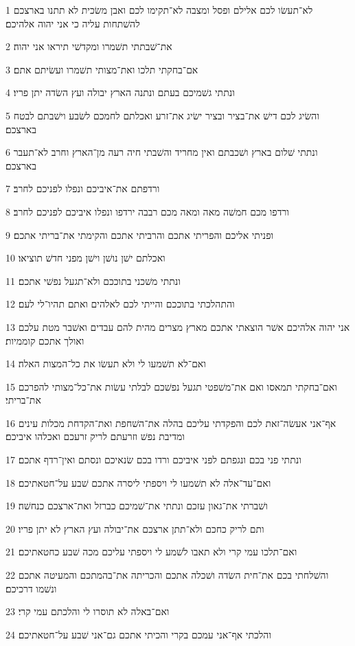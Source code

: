 \par 1 לא־תעשׂו לכם אלילם ופסל ומצבה לא־תקימו לכם ואבן משׂכית לא תתנו בארצכם להשׁתחות עליה כי אני יהוה אלהיכם׃
\par 2 את־שׁבתתי תשׁמרו ומקדשׁי תיראו אני יהוה׃
\par 3 אם־בחקתי תלכו ואת־מצותי תשׁמרו ועשׂיתם אתם׃
\par 4 ונתתי גשׁמיכם בעתם ונתנה הארץ יבולה ועץ השׂדה יתן פריו׃
\par 5 והשׂיג לכם דישׁ את־בציר ובציר ישׂיג את־זרע ואכלתם לחמכם לשׂבע וישׁבתם לבטח בארצכם׃
\par 6 ונתתי שׁלום בארץ ושׁכבתם ואין מחריד והשׁבתי חיה רעה מן־הארץ וחרב לא־תעבר בארצכם׃
\par 7 ורדפתם את־איביכם ונפלו לפניכם לחרב׃
\par 8 ורדפו מכם חמשׁה מאה ומאה מכם רבבה ירדפו ונפלו איביכם לפניכם לחרב׃
\par 9 ופניתי אליכם והפריתי אתכם והרביתי אתכם והקימתי את־בריתי אתכם׃
\par 10 ואכלתם ישׁן נושׁן וישׁן מפני חדשׁ תוציאו׃
\par 11 ונתתי משׁכני בתוככם ולא־תגעל נפשׁי אתכם׃
\par 12 והתהלכתי בתוככם והייתי לכם לאלהים ואתם תהיו־לי לעם׃
\par 13 אני יהוה אלהיכם אשׁר הוצאתי אתכם מארץ מצרים מהית להם עבדים ואשׁבר מטת עלכם ואולך אתכם קוממיות׃
\par 14 ואם־לא תשׁמעו לי ולא תעשׂו את כל־המצות האלה׃
\par 15 ואם־בחקתי תמאסו ואם את־משׁפטי תגעל נפשׁכם לבלתי עשׂות את־כל־מצותי להפרכם את־בריתי׃
\par 16 אף־אני אעשׂה־זאת לכם והפקדתי עליכם בהלה את־השׁחפת ואת־הקדחת מכלות עינים ומדיבת נפשׁ וזרעתם לריק זרעכם ואכלהו איביכם׃
\par 17 ונתתי פני בכם ונגפתם לפני איביכם ורדו בכם שׂנאיכם ונסתם ואין־רדף אתכם׃
\par 18 ואם־עד־אלה לא תשׁמעו לי ויספתי ליסרה אתכם שׁבע על־חטאתיכם׃
\par 19 ושׁברתי את־גאון עזכם ונתתי את־שׁמיכם כברזל ואת־ארצכם כנחשׁה׃
\par 20 ותם לריק כחכם ולא־תתן ארצכם את־יבולה ועץ הארץ לא יתן פריו׃
\par 21 ואם־תלכו עמי קרי ולא תאבו לשׁמע לי ויספתי עליכם מכה שׁבע כחטאתיכם׃
\par 22 והשׁלחתי בכם את־חית השׂדה ושׁכלה אתכם והכריתה את־בהמתכם והמעיטה אתכם ונשׁמו דרכיכם׃
\par 23 ואם־באלה לא תוסרו לי והלכתם עמי קרי׃
\par 24 והלכתי אף־אני עמכם בקרי והכיתי אתכם גם־אני שׁבע על־חטאתיכם׃
